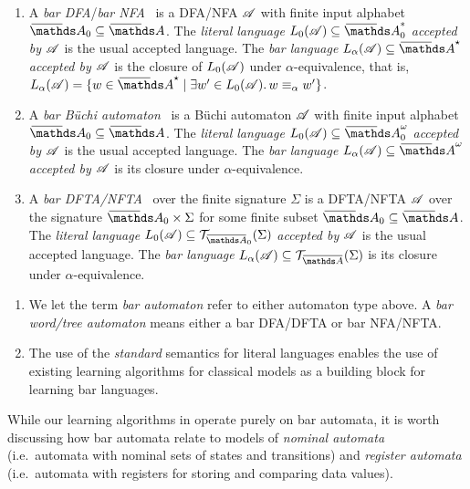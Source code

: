 \documentclass[a4paper,UKenglish,cleveref,autoref,thm-restate,numberwithinsect,final]{lipics-v2021}
\begin{document}
    \begin{defn}\label{defn:barautomata}
        \begin{enumerate}
            \item A \emph{bar DFA}/\emph{bar NFA}~\cite{skmw17} is a DFA/NFA $\mathscr{A}$ with finite input alphabet $\barNames_0\seq \barNames$. The \emph{literal language} $L_0(\A) \seq \barNames_0^*$ \emph{accepted by $\mathscr{A}$} is the usual accepted language. The \emph{bar language} 
                $L_\alpha(\A) \seq \barAs$ \emph{accepted by $\mathscr{A}$} is the closure of $L_0(\mathscr{A})$ under $\alpha$-equivalence, that is, $L_\alpha(\A)=\set{w\in \barAs \mid \exists w'\in L_0(\A).\, w\equiv_\alpha w'}$.
            \item A \emph{bar Büchi automaton}~\cite{uhms21} is a Büchi automaton $\mathscr{A}$ with finite input alphabet $\barNames_0\seq \barNames$. The
                \emph{literal language} $L_0(\A)\seq \barNames_0^\omega$ \emph{accepted by $\mathscr{A}$} is the usual accepted language. The \emph{bar language} $L_\alpha(\A) \seq \barAw$ \emph{accepted by $\mathscr{A}$} is its closure under $\alpha$-equivalence. 
            \item A \emph{bar DFTA/NFTA}~\cite{ps24} over the finite signature $\Sigma$ is a DFTA/NFTA $\mathscr{A}$ over the signature $\barNames_0\times \Sigma$ for some finite subset $\barNames_0\seq \barNames$. The \emph{literal language}
                $L_0(\A)\seq \bartree[\barNamess_0](\Sigma)$ \emph{accepted by $\mathscr{A}$} is the usual accepted language. The \emph{bar language} $L_\alpha(\A)\seq \bartree(\Sigma)$ is its closure under $\alpha$-equivalence.
        \end{enumerate}
    \end{defn}

    \begin{rem}\label{rem:EquivalentModels}
        \begin{enumerate}
            \item We let the term \emph{bar automaton} refer to either automaton type above. A \emph{bar word/tree automaton}  means either a bar DFA/DFTA or bar NFA/NFTA. 
            \item The use of the \emph{standard} semantics for literal languages enables the use of existing learning algorithms for classical models as a building block for learning bar languages.
\end{enumerate}
\end{rem}

While our learning algorithms in  operate purely on bar automata, it is worth discussing how bar automata relate to models of \emph{nominal automata} (i.e.~automata with nominal sets of states and transitions) and \emph{register automata} (i.e.~automata with registers for storing and comparing data values).
\end{document}
